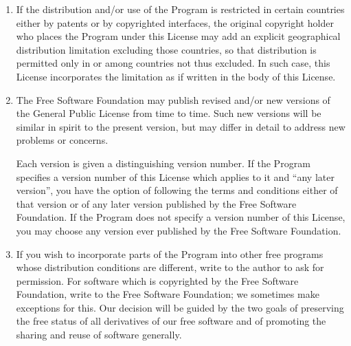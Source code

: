 {\begin{multicols}{2}
\begin{enumerate}
It is not the purpose of this section to induce you to infringe any
patents or other property right claims or to contest validity of any
such claims; this section has the sole purpose of protecting the
integrity of the free software distribution system, which is
implemented by public license practices.  Many people have made
generous contributions to the wide range of software distributed
through that system in reliance on consistent application of that
system; it is up to the author/donor to decide if he or she is willing
to distribute software through any other system and a licensee cannot
impose that choice.

This section is intended to make thoroughly clear what is believed to
be a consequence of the rest of this License.

\item
If the distribution and/or use of the Program is restricted in
certain countries either by patents or by copyrighted interfaces, the
original copyright holder who places the Program under this License
may add an explicit geographical distribution limitation excluding
those countries, so that distribution is permitted only in or among
countries not thus excluded.  In such case, this License incorporates
the limitation as if written in the body of this License.

\item
The Free Software Foundation may publish revised and/or new versions
of the General Public License from time to time.  Such new versions will
be similar in spirit to the present version, but may differ in detail to
address new problems or concerns.

Each version is given a distinguishing version number.  If the Program
specifies a version number of this License which applies to it and ``any
later version'', you have the option of following the terms and conditions
either of that version or of any later version published by the Free
Software Foundation.  If the Program does not specify a version number of
this License, you may choose any version ever published by the Free Software
Foundation.

\item
If you wish to incorporate parts of the Program into other free
programs whose distribution conditions are different, write to the author
to ask for permission.  For software which is copyrighted by the Free
Software Foundation, write to the Free Software Foundation; we sometimes
make exceptions for this.  Our decision will be guided by the two goals
of preserving the free status of all derivatives of our free software and
of promoting the sharing and reuse of software generally.


\end{enumerate}
\end{multicols}}
